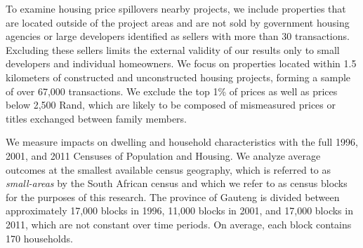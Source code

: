 \documentclass[12pt]{article}
\begin{document}





To examine housing price spillovers nearby projects, we include properties that are located outside of the project areas and are not sold by government housing agencies or large developers identified as sellers with more than 30 transactions.  Excluding these sellers limits the external validity of our results only to small developers and individual homeowners.  We focus on properties located within 1.5 kilometers of constructed and unconstructed housing projects, forming a sample of over 67,000 transactions.  We exclude the top 1\% of prices as well as prices below 2,500 Rand, which are likely to be composed of mismeasured prices or titles exchanged between family members. 



We measure impacts on dwelling and household characteristics with the full 1996, 2001, and 2011 Censuses of Population and Housing. We analyze average outcomes at the smallest available census geography, which is referred to as {\it small-areas} by the South African census and which we refer to as census blocks for the purposes of this research.  The province of Gauteng is divided between approximately 17,000 blocks in 1996, 11,000 blocks in 2001, and 17,000 blocks in 2011, which are not constant over time periods.  On average, each block contains 170 households. 
\end{document}
